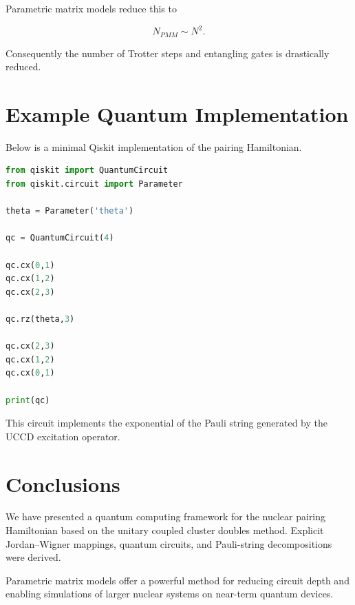 \documentclass[twocolumn,superscriptaddress,unsortedaddress,nofootinbib,amsmath,amssymb,
aps,floatfix]{revtex4-2}
\begin{document}
Parametric matrix models reduce this to

\begin{equation}
N_{PMM} \sim N^2 .
\end{equation}

Consequently the number of Trotter steps and entangling gates
is drastically reduced.

\section{Example Quantum Implementation}

Below is a minimal Qiskit implementation of the pairing Hamiltonian.

\begin{lstlisting}[language=Python]
from qiskit import QuantumCircuit
from qiskit.circuit import Parameter

theta = Parameter('theta')

qc = QuantumCircuit(4)

qc.cx(0,1)
qc.cx(1,2)
qc.cx(2,3)

qc.rz(theta,3)

qc.cx(2,3)
qc.cx(1,2)
qc.cx(0,1)

print(qc)
\end{lstlisting}

This circuit implements the exponential of the Pauli string
generated by the UCCD excitation operator.

\section{Conclusions}

We have presented a quantum computing framework for the nuclear
pairing Hamiltonian based on the unitary coupled cluster doubles
method. Explicit Jordan--Wigner mappings, quantum circuits,
and Pauli-string decompositions were derived.

Parametric matrix models offer a powerful method for reducing
circuit depth and enabling simulations of larger nuclear systems
on near-term quantum devices.
\end{document}
